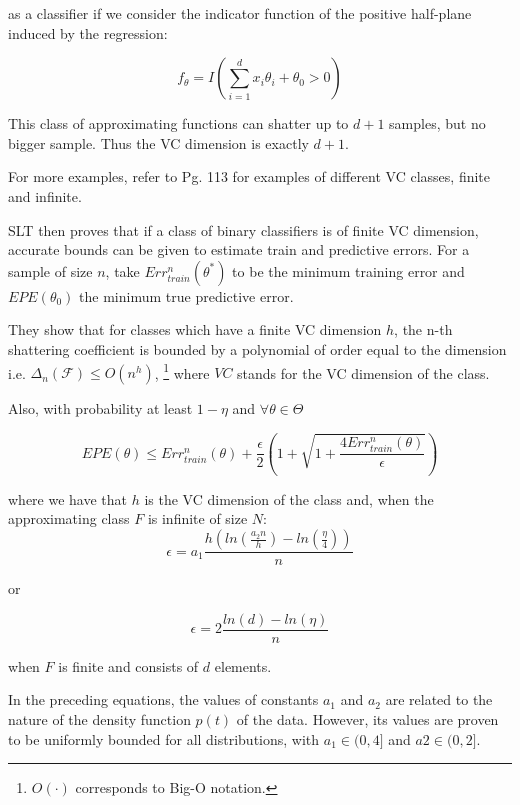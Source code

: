  as a classifier if we consider the indicator function of the positive half-plane induced by the regression: 
 
\begin{equation}
f_{\theta} = I(\sum_{i=1}^d x_i \theta_i + \theta_0 > 0)
\end{equation}

This class of approximating functions can shatter up to $d+1$ samples, but no bigger sample. Thus the VC dimension is exactly $d+1$.

For more examples, refer to \textcite{cherkassky-learning2007} Pg. 113 for examples of different VC classes, finite and infinite.

SLT then proves that if a class of binary classifiers is of finite VC dimension, accurate bounds can be given to estimate train and predictive errors. For a sample of size $n$, take $Err^n_{train}(\theta^*)$ to be the minimum training error and $EPE(\theta_0)$ the minimum true predictive error.

They show that for classes which have a finite VC dimension $h$, the n-th shattering coefficient is bounded by a polynomial of order equal to the dimension
i.e. $\Delta_n(\mathcal {F}) \leq O(n^{h})$, \footnote{$O(\cdot)$ corresponds to Big-O notation.} where $VC$ stands for the VC dimension of the class.

Also, with probability at least $1 - \eta$ and $\forall \theta \in \Theta$

\begin{equation}\label{vapnik-classificationBound}
EPE(\theta) \leq Err^n_{train}(\theta) + \frac{\epsilon}{2} \left(1 + \sqrt{1 + \frac{4 Err^n_{train}(\theta) }{\epsilon}} \right)
\end{equation}

where we have that $h$ is the VC dimension of the class and, when the approximating class $F$ is infinite of size $N$:
\begin{equation}\label{vapnik-epsilonBound}
\epsilon = a_1 \frac{h \left( ln(\frac{a_2 n}{h} ) - ln(\frac{\eta}{4} ) \right)}{n}
\end{equation}

or

\begin{equation}\label{vapnik-epsilonBound}
\epsilon = 2 \frac{ ln(d) - ln(\eta)}{n}
\end{equation}

when $F$ is finite and consists of $d$ elements.

In the preceding equations, the values of constants $a_1$ and $a_2$ are related to the nature of the density function $p(t)$ of the data. However, its values are proven to be uniformly bounded for all distributions, with $a_1 \in (0,4 ]$ and $a2 \in (0,2 ]$.

